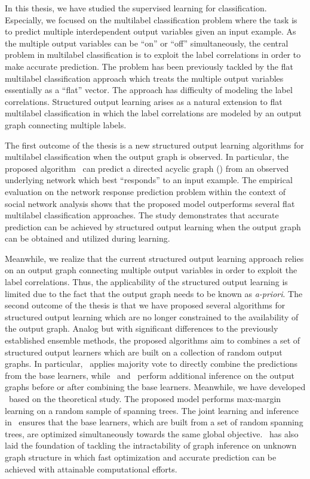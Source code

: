 {In this thesis, we have studied the supervised learning for classification.
Especially, we focused on the multilabel classification problem where the task is to predict multiple interdependent output variables given an input example.
As the multiple output variables can be ``on'' or ``off'' simultaneously, the central problem in multilabel classification is to exploit the label correlations in order to make accurate prediction.
The problem has been previously tackled by the flat multilabel classification approach which treats the multiple output variables essentially as a ``flat'' vector.
The approach has difficulty of modeling the label correlations.
Structured output learning arises as a natural extension to flat multilabel classification in which the label correlations are modeled by an output graph connecting multiple labels.

The first outcome of the thesis is a new structured output learning algorithms for multilabel classification when the output graph is observed.
In particular, the proposed algorithm \spin\ can predict a directed acyclic graph (\daggraph) from an observed underlying network which best ``responds'' to an input example.
The empirical evaluation on the network response prediction problem within the context of social network analysis shows that the proposed model outperforms several flat multilabel classification approaches.
The study demonstrates that accurate prediction can be achieved by structured output learning when the output graph can be obtained and utilized during learning.

Meanwhile, we realize that the current structured output learning approach relies on an output graph connecting multiple output variables in order to exploit the label correlations.
Thus, the applicability of the structured output learning is limited due to the fact that the output graph needs to be known as \textit{a-priori}.
The second outcome of the thesis is that we have proposed several algorithms for structured output learning which are no longer constrained to the availability of the output graph.
Analog but with significant differences to the previously established ensemble methods, the proposed algorithms aim to combines a set of structured output learners which are built on a collection of random output graphs.
In particular, \mve\ applies majority vote to directly combine the predictions from the base learners, while \amm\ and \mam\ perform additional inference on the output graphs before or after combining the base learners.
Meanwhile, we have developed \rta\ based on the theoretical study.
The proposed model performs max-margin learning on a random sample of spanning trees.
The joint learning and inference in \rta\ ensures that the base learners, which are built from a set of random spanning trees, are optimized simultaneously towards the same global objective.
\rta\ has also laid the foundation of tackling the intractability of graph inference on unknown graph structure in which fast optimization and accurate prediction can be achieved with attainable computational efforts.

}
